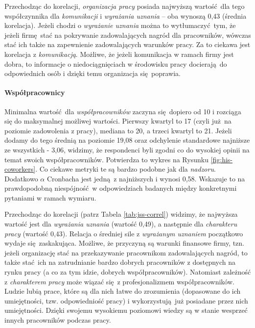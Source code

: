 Przechodząc do korelacji, \textit{organizacja pracy} posiada najwyższą wartość dla tego współczynnika dla \textit{komunikacji} i \textit{wyrażania uznania} -- oba wynoszą 0,43 (średnia korelacja). Jeżeli chodzi o \textit{wyrażanie uznania} można to wytłumaczyć tym, że jeżeli firmę stać na pokrywanie zadowalających nagród dla pracowników, wówczas stać ich także na zapewnienie zadowalających warunków pracy. Za to ciekawa jest korelacja z \textit{komunikacją}. Możliwe, że jeżeli komunikacja w ramach firmy jest dobra, to informacje o niedociągnięciach w
środowisku pracy docierają do odpowiednich osób i dzięki temu organizacja się poprawia. 

\paragraph{Współpracownicy} Minimalna wartość dla \textit{współpracowników} zaczyna się dopiero od 10 i rozciąga się do maksymalnej możliwej wartości. Pierwszy kwartyl to 17 (czyli już na poziomie zadowolenia z pracy), mediana to 20, a trzeci kwartyl to 21. Jeżeli dodamy do tego średnią na poziomie 19,08 oraz odchylenie standardowe najniższe ze wszystkich - 3,06, widzimy, że respondenci byli zgodni co do wysokiej opinii na temat swoich współpracowników. Potwierdza to wykres
na Rysunku \ref{fig:his-coworkers}. Co ciekawe metryki te są bardzo podobne jak dla \textit{nadzoru}. Dodatkowo $\alpha$ Cronbacha jest jedną z najniższych i wynosi 0,58. Wskazuje to na prawdopodobną niespójność w odpowiedziach badanych między konkretnymi pytaniami w ramach wymiaru.

Przechodząc do korelacji (patrz Tabela \ref{tab:jss-correl}) widzimy, że najwyższa wartość jest dla \textit{wyrażania uznania} (wartość 0,49), a następnie dla \textit{charakteru pracy} (wartość 0,43). Relacja o średniej sile z \textit{wyrażanym uznaniem} początkowo wydaje się zaskakująca. Możliwe, że przyczyną są warunki finansowe firmy, tzn. jeżeli organizację stać na przekazywanie pracownikom zadowalających nagród, to także stać ich na zatrudnianie bardzo dobrych pracowników z dostępnych
na rynku pracy (a co za tym idzie, dobrych współpracowników). Natomiast zależność z \textit{charakterem pracy} może wiązać się z profesjonalizmem współpracowników. Ludzie lubią prace, które są dla nich łatwe do zrozumienia (dopasowane do ich umiejętności, tzw. odpowiedniość pracy) i wykorzystują już posiadane przez nich umiejętności. Dzięki swojemu wysokiemu poziomowi wiedzy są w stanie wesprzeć innych pracowników podczas pracy.

